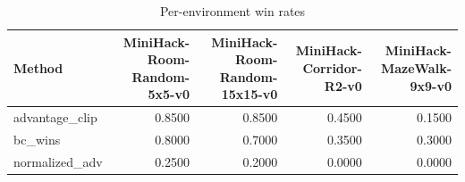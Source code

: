 \begin{table}[htbp]
\centering
\caption{Per-environment win rates}
\label{tab:per-env}
\begin{tabular}{lrrrr}
\toprule
\textbf{Method} & \textbf{MiniHack-Room-Random-5x5-v0} & \textbf{MiniHack-Room-Random-15x15-v0} & \textbf{MiniHack-Corridor-R2-v0} & \textbf{MiniHack-MazeWalk-9x9-v0} \\
\midrule
advantage\_clip & 0.8500 & 0.8500 & 0.4500 & 0.1500 \\
bc\_wins & 0.8000 & 0.7000 & 0.3500 & 0.3000 \\
normalized\_adv & 0.2500 & 0.2000 & 0.0000 & 0.0000 \\
\bottomrule
\end{tabular}
\end{table}